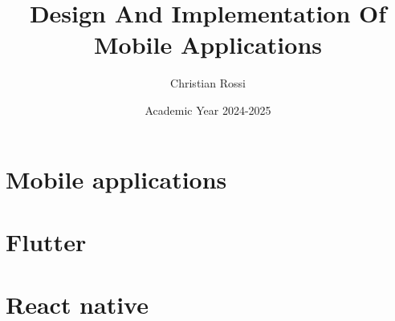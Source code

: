\documentclass[12pt, a4paper]{report}
\title{\textbf{Design And Implementation Of Mobile Applications}}
\author{Christian Rossi}
\date{Academic Year 2024-2025}
\begin{document}
    \maketitle

    

    \cleardoublepage

    \tableofcontents

    \cleardoublepage

    \chapter{Mobile applications}
    
    

    \chapter{Flutter}
    
    
    

    \chapter{React native}
    
\end{document}
